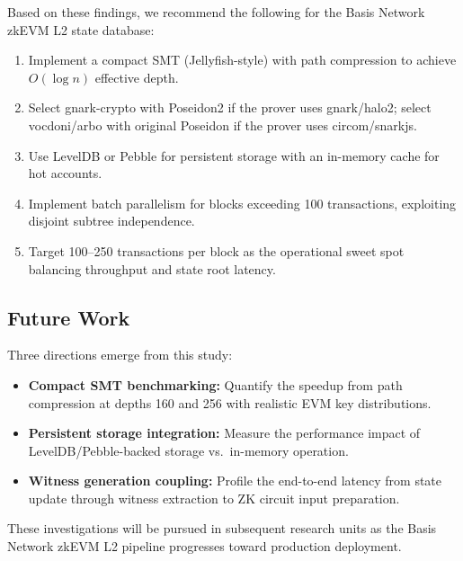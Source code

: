 Based on these findings, we recommend the following for the Basis
Network zkEVM L2 state database:

\begin{enumerate}
  \item Implement a compact SMT (Jellyfish-style) with path
    compression to achieve $O(\log n)$ effective depth.
  \item Select gnark-crypto with Poseidon2 if the prover uses
    gnark/halo2; select vocdoni/arbo with original Poseidon if
    the prover uses circom/snarkjs.
  \item Use LevelDB or Pebble for persistent storage with an
    in-memory cache for hot accounts.
  \item Implement batch parallelism for blocks exceeding 100
    transactions, exploiting disjoint subtree independence.
  \item Target 100--250 transactions per block as the operational
    sweet spot balancing throughput and state root latency.
\end{enumerate}

\subsection{Future Work}

Three directions emerge from this study:

\begin{itemize}
  \item \textbf{Compact SMT benchmarking:} Quantify the speedup from
    path compression at depths 160 and 256 with realistic EVM key
    distributions.
  \item \textbf{Persistent storage integration:} Measure the
    performance impact of LevelDB/Pebble-backed storage vs.\
    in-memory operation.
  \item \textbf{Witness generation coupling:} Profile the end-to-end
    latency from state update through witness extraction to ZK
    circuit input preparation.
\end{itemize}

These investigations will be pursued in subsequent research units
as the Basis Network zkEVM L2 pipeline progresses toward production
deployment.
